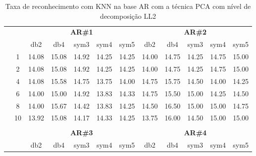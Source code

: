 \begin{table}[htpb]
	\centering
    \normalsize
	\caption{Taxa de reconhecimento com KNN na base AR com a técnica PCA com nível de decomposição LL2}
	\begin{tabular}{|c|c|c c c c c|c c c c c|}
\cline{3-12}
\multicolumn{2}{c|}{\multirow{2}{*}{}} & \multicolumn{5}{c|}{\textbf{AR\#1}}  & \multicolumn{5}{c|}{\textbf{AR\#2}} \\\cline{3-12}

\multicolumn{2}{c|}{}  & db2 & db4 & sym3 & sym4 & sym5 & db2 & db4& sym3 & sym4 & sym5 \\\hline

\multicolumn{1}{|c|}{ \multirow{5}{*}{\rotatebox[origin=c]{90}{\textbf{K-vizinhos}}} }
&1	&14.08	&15.08	&14.92	&14.25	&14.25	&14.00	&14.75	&14.25	&14.75	&15.00\\\cline{2-12}
&2	&14.08	&15.08	&14.92	&14.25	&14.25	&14.00	&14.75	&14.25	&14.75	&15.00\\\cline{2-12}
&4	&14.08	&15.58	&14.75	&13.75	&14.00	&14.75	&15.75	&14.50	&14.00	&14.25\\\cline{2-12}
&6	&14.00	&15.00	&14.92	&13.83	&14.33	&14.75	&15.50	&15.00	&14.25	&14.50\\\cline{2-12}
&8	&14.00	&15.67	&14.42	&13.83	&14.25	&14.50	&16.50	&15.00	&15.00	&14.75\\\cline{2-12}
&10	&13.92	&15.08	&14.17	&14.33	&14.25	&13.75	&16.00	&14.50	&15.00	&15.00%
\\ \midrule
\multicolumn{12}{c}{}\\ 




\cline{3-12}
\multicolumn{2}{c}{} & \multicolumn{5}{|c|}{\textbf{AR\#3}}  & \multicolumn{5}{c|}{\textbf{AR\#4}} \\\cline{3-12}
\multicolumn{2}{c}{}  & \multicolumn{1}{|c}{db2} & db4 & sym3 & sym4 & sym5 & db2 & db4& sym3 & sym4 & sym5 \\\hline


\end{tabular}
\end{table}
